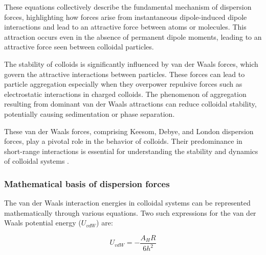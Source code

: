 These equations collectively describe the fundamental mechanism of dispersion forces, highlighting how forces arise from instantaneous dipole-induced dipole interactions and lead to an attractive force between atoms or molecules. This attraction occurs even in the absence of permanent dipole moments, leading to an attractive force seen between colloidal particles.

The stability of colloids is significantly influenced by van der Waals forces, which govern the attractive interactions between particles. These forces can lead to particle aggregation especially when they overpower repulsive forces such as electrostatic interactions in charged colloids. The phenomenon of aggregation resulting from dominant van der Waals attractions can reduce colloidal stability, potentially causing sedimentation or phase separation. 

These van der Waals forces, comprising Keesom, Debye, and London dispersion forces, play a pivotal role in the behavior of colloids. Their predominance in short-range interactions is essential for understanding the stability and dynamics of colloidal systems \cite{colloid_review1}\cite{lilBlueBook}\cite{IsGreenBook}\cite{FoundColloidBook}. %

\subsubsection{Mathematical basis of dispersion forces} %

The van der Waals interaction energies in colloidal systems can be represented mathematically through various equations. Two such expressions for the van der Waals potential energy (\(U_{vdW}\)) are:

\begin{equation}  %
U_{vdW} = -\frac{A_H R}{6 h^2}
\label{Hammy}
\end{equation}


